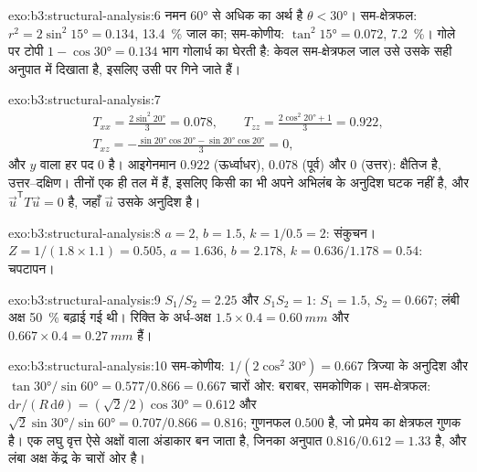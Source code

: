 \begin{solution}{exo:b3:structural-analysis:6}
नमन \ang{60} से अधिक का अर्थ है $\theta < \ang{30}$। सम-क्षेत्रफल: $r^2 =
2\sin^2\ang{15} = 0.134$, \qty{13.4}{\percent} जाल का; सम-कोणीय:
$\tan^2\ang{15} = 0.072$, \qty{7.2}{\percent}। गोले पर टोपी
$1 - \cos\ang{30} = 0.134$ भाग गोलार्ध का घेरती है: केवल सम-क्षेत्रफल जाल
उसे उसके सही अनुपात में दिखाता है, इसलिए  उसी पर गिने जाते हैं।
\end{solution}

\begin{solution}{exo:b3:structural-analysis:7}
\begin{gather*}
  T_{xx} = \frac{2\sin^2\ang{20}}3 = 0.078,\qquad
  T_{zz} = \frac{2\cos^2\ang{20} + 1}3 = 0.922,\\
  T_{xz} = -\frac{\sin\ang{20}\cos\ang{20} - \sin\ang{20}\cos\ang{20}}3 = 0,
\end{gather*}
और $y$ वाला हर पद 0 है। आइगेनमान $0.922$ (ऊर्ध्वाधर),
$0.078$ (पूर्व) और $0$ (उत्तर):  क्षैतिज है, उत्तर--दक्षिण।
तीनों  एक ही तल में हैं, इसलिए किसी का भी अपने अभिलंब के अनुदिश घटक नहीं है,
और $\vec u^{\mathsf T}T\vec u = 0$ है, जहाँ $\vec u$ उसके अनुदिश है।
\end{solution}

\begin{solution}{exo:b3:structural-analysis:8}
$a = 2$, $b = 1.5$, $k = 1/0.5 = 2$: संकुचन। $Z = 1/(1.8\times1.1) =
0.505$, $a = 1.636$, $b = 2.178$, $k = 0.636/1.178 = 0.54$: चपटापन।
\end{solution}

\begin{solution}{exo:b3:structural-analysis:9}
$S_1/S_2 = 2.25$ और $S_1S_2 = 1$: $S_1 = 1.5$, $S_2 = 0.667$; लंबी अक्ष
\qty{50}{\percent} बढ़ाई गई थी। रिक्ति के अर्ध-अक्ष $1.5\times0.4 =
\qty{0.60}{mm}$ और $0.667\times0.4 = \qty{0.27}{mm}$ हैं।
\end{solution}

\begin{solution}{exo:b3:structural-analysis:10}
सम-कोणीय: $1/(2\cos^2\ang{30}) = 0.667$ त्रिज्या के अनुदिश और
$\tan\ang{30}/\sin\ang{60} = 0.577/0.866 = 0.667$ चारों ओर: बराबर, समकोणिक।
सम-क्षेत्रफल: $\mathrm dr/(R\,\mathrm d\theta) = (\sqrt2/2)\cos\ang{30} = 0.612$
और $\sqrt2\sin\ang{30}/\sin\ang{60} = 0.707/0.866 = 0.816$; गुणनफल
$0.500$ है, जो प्रमेय का क्षेत्रफल गुणक है। एक लघु वृत्त ऐसे अक्षों वाला अंडाकार बन जाता है,
जिनका अनुपात $0.816/0.612 = 1.33$ है, और लंबा अक्ष केंद्र के चारों ओर है।
\end{solution}


